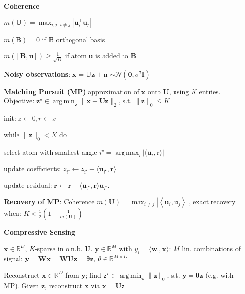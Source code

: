 \documentclass[a4paper, 11pt, landscape]{article}
\DeclareMathOperator*{\argmin}{arg\,min}
\DeclareMathOperator*{\argmax}{arg\,max}
\begin{document}
\begin{multicols*}{3}
\textbf{Coherence}
\begin{inparaitem}[\color{red}\textbullet]
	\item $m(\mathbf{U}) = \max_{i,j:\, i \neq j} | \mathbf{u}_i^\top \mathbf{u}_j |$
	\item $m(\mathbf{B}) = 0$ if $\mathbf{B}$ orthogonal basis
	\item $m([\mathbf{B}, \mathbf{u}]) \geq \frac{1}{\sqrt{D}}$ if atom $\mathbf{u}$ is added to $\mathbf{B}$
\end{inparaitem}

\textbf{Noisy observations}: $\mathbf{x}=\mathbf{U}\mathbf{z} + \mathbf{n}$ $\sim \mathcal{N}\left( \mathbf{0}, \sigma^2\mathbf{I} \right)$

\textbf{Matching Pursuit (MP)}
approximation of $\mathbf{x}$ onto $\mathbf{U}$, using $K$ entries.
Objective: $\mathbf{z}^\star \in \argmin_{\mathbf{z}} \|\mathbf{x} - \mathbf{Uz} \|_2$, s.t. $\|\mathbf{z}\|_0 \leq K$
\begin{inparaenum}
	\item init: $z \leftarrow 0, r \leftarrow x$
	\item while $\|\mathbf{z}\|_0 < K$ do
	\item select atom with smallest angle $i^\star = \argmax_i |\langle \mathbf{u}_i, \mathbf{r} \rangle|$
	\item update coefficients: $z_{i^\star} \leftarrow z_{i^\star} + \langle \mathbf{u}_{i^\star}, \mathbf{r} \rangle$
	\item update residual: $\mathbf{r} \leftarrow \mathbf{r} - \langle \mathbf{u}_{i^\star}, \mathbf{r} \rangle \mathbf{u}_{i^\star}$.
\end{inparaenum}

\textbf{Recovery of MP}: Coherence $m(\mathbf{U}) = \max_{i\neq j}|\left< \mathbf{u}_i, \mathbf{u}_j \right>|$,
exact recovery when: $K<\frac{1}{2}\left( 1+\frac{1}{m(\mathbf{U})} \right)$

\textbf{Compressive Sensing}
\begin{inparaitem}[\color{red}\textbullet]
  \item $\mathbf{x} \in \mathbb{R}^D$, $K$-sparse in o.n.b. $\mathbf{U}$. $\mathbf{y} \in \mathbb{R}^M$ with $y_i = \langle \mathbf{w}_i, \mathbf{x}\rangle $: $M$ lin. combinations of signal; $\mathbf{y} = \mathbf{Wx} = \mathbf{WUz} = \mathbf{\theta z}$, $\theta \in \mathbb{R}^{M \times D}$
  \item Reconstruct $\mathbf{x} \in \mathbb{R}^D$ from $\mathbf{y}$; find $\mathbf{z}^\star \in \argmin_{\mathbf{z}}\|\mathbf{z}\|_0$, s.t. $\mathbf{y} = \mathbf{\theta z}$ (e.g. with MP). Given $\mathbf{z}$, reconstruct $\mathbf{x}$ via $\mathbf{x} = \mathbf{Uz}$
\end{inparaitem}


\end{multicols*}
\end{document}
